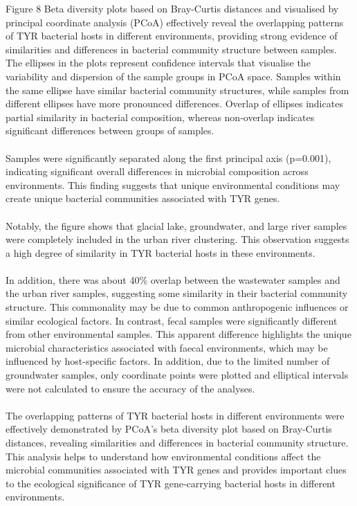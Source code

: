 \documentclass[12pt]{article}
\begin{document}
Figure 8 Beta diversity plots based on Bray-Curtis distances and visualised by principal coordinate analysis (PCoA) effectively reveal the overlapping patterns of TYR bacterial hosts in different environments, providing strong evidence of similarities and differences in bacterial community structure between samples. The ellipses in the plots represent confidence intervals that visualise the variability and dispersion of the sample groups in PCoA space. Samples within the same ellipse have similar bacterial community structures, while samples from different ellipses have more pronounced differences. Overlap of ellipses indicates partial similarity in bacterial composition, whereas non-overlap indicates significant differences between groups of samples.\\\\
Samples were significantly separated along the first principal axis (p=0.001), indicating significant overall differences in microbial composition across environments. This finding suggests that unique environmental conditions may create unique bacterial communities associated with TYR genes.\\\\
Notably, the figure shows that glacial lake, groundwater, and large river samples were completely included in the urban river clustering. This observation suggests a high degree of similarity in TYR bacterial hosts in these environments.\\\\
In addition, there was about 40\% overlap between the wastewater samples and the urban river samples, suggesting some similarity in their bacterial community structure. This commonality may be due to common anthropogenic influences or similar ecological factors. In contrast, fecal samples were significantly different from other environmental samples. This apparent difference highlights the unique microbial characteristics associated with faecal environments, which may be influenced by host-specific factors. In addition, due to the limited number of groundwater samples, only coordinate points were plotted and elliptical intervals were not calculated to ensure the accuracy of the analyses.\\\\
The overlapping patterns of TYR bacterial hosts in different environments were effectively demonstrated by PCoA's beta diversity plot based on Bray-Curtis distances, revealing similarities and differences in bacterial community structure. This analysis helps to understand how environmental conditions affect the microbial communities associated with TYR genes and provides important clues to the ecological significance of TYR gene-carrying bacterial hosts in different environments.\\\\
\end{document}
